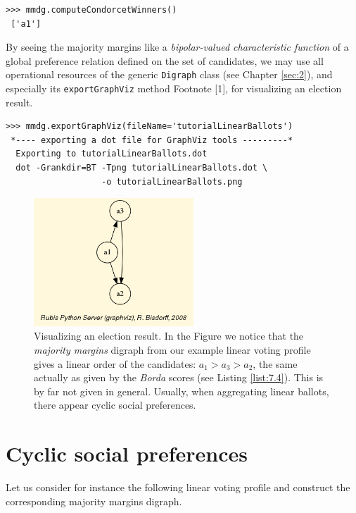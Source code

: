 \begin{lstlisting}[basicstyle=\footnotesize]
>>> mmdg.computeCondorcetWinners()
 ['a1']  
\end{lstlisting}    

By seeing the majority margins like a \emph{bipolar-valued characteristic function} of a global preference relation defined on the set of candidates, we may use all operational resources of the generic \texttt{Digraph} class (see Chapter \ref{sec:2}), and especially its \texttt{exportGraphViz} method Footnote [1], for visualizing an election result.

\begin{lstlisting}[basicstyle=\footnotesize]
>>> mmdg.exportGraphViz(fileName='tutorialLinearBallots')
 *---- exporting a dot file for GraphViz tools ---------*
  Exporting to tutorialLinearBallots.dot
  dot -Grankdir=BT -Tpng tutorialLinearBallots.dot \
                   -o tutorialLinearBallots.png
\end{lstlisting}

\begin{figure}[h]
\sidecaption
\includegraphics[width=6cm]{Figures/tutorialLinearBallots.png}
\caption{Visualizing an election result. In the Figure we notice that the \emph{majority margins} digraph from our example linear voting profile gives a linear order of the candidates: $a_1 > a_3 > a_2$, the same actually as given by the \emph{Borda} scores (see Listing \ref{list:7.4}). This is by far not given in general. Usually, when aggregating linear ballots, there appear cyclic social preferences.
}
\label{fig:7.1}       %
\end{figure}

\section{Cyclic social preferences}
\label{sec:7.4}

Let us consider for instance the following linear voting profile and construct the corresponding majority margins digraph.

